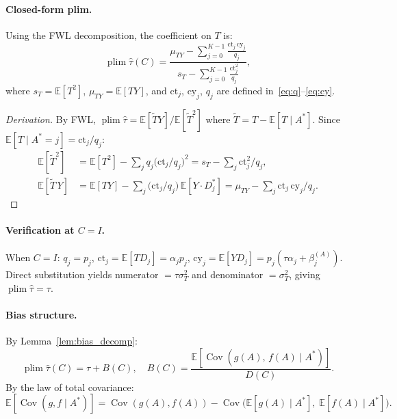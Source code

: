 \paragraph{Closed-form plim.}
Using the FWL decomposition, the coefficient on $T$ is:
\begin{equation}
  \operatorname{plim}\hat\tau(C)
  = \frac{\mu_{TY} - \sum_{j=0}^{K-1}\frac{\mathrm{ct}_j\,\mathrm{cy}_j}{q_j}}
  {s_T - \sum_{j=0}^{K-1}\frac{\mathrm{ct}_j^2}{q_j}},
  \label{eq:plim_conf}
\end{equation}
where $s_T=\mathbb{E}[T^2]$, $\mu_{TY}=\mathbb{E}[TY]$, and $\mathrm{ct}_j$, $\mathrm{cy}_j$, $q_j$ are defined in~\eqref{eq:q}--\eqref{eq:cy}.

\begin{proof}[Derivation]
By FWL, $\operatorname{plim}\hat\tau = \mathbb{E}[\tilde{T}Y]/\mathbb{E}[\tilde{T}^2]$ where $\tilde{T}=T-\mathbb{E}[T\mid A^*]$.
Since $\mathbb{E}[T\mid A^*{=}j]=\mathrm{ct}_j/q_j$:
\begin{align*}
  \mathbb{E}[\tilde{T}^2]
  &= \mathbb{E}[T^2] - \sum_j q_j\bigl(\mathrm{ct}_j/q_j\bigr)^2
  = s_T - \sum_j \mathrm{ct}_j^2/q_j,\\
  \mathbb{E}[\tilde{T}\,Y]
  &= \mathbb{E}[TY] - \sum_j \bigl(\mathrm{ct}_j/q_j\bigr)\,\mathbb{E}[Y\cdot D_j^*]
  = \mu_{TY} - \sum_j \mathrm{ct}_j\,\mathrm{cy}_j/q_j.
\end{align*}
\end{proof}

\paragraph{Verification at $C=I$.}
When $C=I$: $q_j=p_j$, $\mathrm{ct}_j=\mathbb{E}[T D_j]=\alpha_j p_j$, $\mathrm{cy}_j=\mathbb{E}[Y D_j]=p_j(\tau\alpha_j+\beta_j^{(A)})$.
Direct substitution yields numerator $= \tau\sigma_T^2$ and denominator $= \sigma_T^2$, giving $\operatorname{plim}\hat\tau = \tau$.

\paragraph{Bias structure.}
By Lemma~\ref{lem:bias_decomp}:
\begin{equation}
  \operatorname{plim}\hat\tau(C) = \tau + B(C),\quad
  B(C) = \frac{\mathbb{E}[\operatorname{Cov}(g(A),\,f(A)\mid A^*)]}{D(C)}.
  \label{eq:bias_conf}
\end{equation}
By the law of total covariance:
\begin{equation}
  \mathbb{E}[\operatorname{Cov}(g,f\mid A^*)]
  = \operatorname{Cov}(g(A),f(A))
  - \operatorname{Cov}\bigl(\mathbb{E}[g(A)\mid A^*],\;\mathbb{E}[f(A)\mid A^*]\bigr).
  \label{eq:lotc}
\end{equation}

